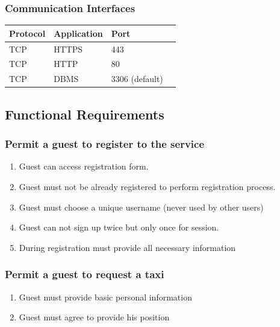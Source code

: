 		\subsubsection{Communication Interfaces}
			\begin{center}
				\begin{tabular}{ | l | l | l | p{5cm} |}
					\hline
					Protocol & Application & Port 	\\ \hline
					TCP & HTTPS & 443				\\ \hline
					TCP & HTTP  & 80				\\ \hline
					TCP & DBMS  & 3306 (default)	\\ \hline
				\end{tabular}
			\end{center}
	\subsection{Functional Requirements}
		\subsubsection{Permit a guest to register to the service}
			\begin{enumerate}[label=\bfseries R\arabic*:]
				\item Guest can access registration form.
				\item Guest must not be already registered to perform registration process.
				\item Guest must choose a unique username (never used by other users)
				\item Guest can not sign up twice but only once for session.
				\item During registration must provide all necessary information
			\end{enumerate}
		\subsubsection{Permit a guest to request a taxi}
			\begin{enumerate}[label=\bfseries R\arabic*:]
				\item Guest must provide basic personal information
				\item Guest must agree to provide his position
			\end{enumerate}
